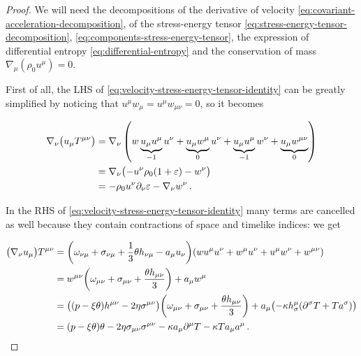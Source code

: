 \documentclass[main.tex]{subfiles}
\begin{document}
\begin{proof}
    We will need the decompositions of
    the derivative of velocity \eqref{eq:covariant-acceleration-decomposition},
    of the stress-energy tensor \eqref{eq:stress-energy-tensor-decomposition}, \eqref{eq:components-stress-energy-tensor},
    the expression of differential entropy \eqref{eq:differential-entropy}
    and the conservation of mass \(\nabla_\mu (\rho_0 u^\mu) = 0\).

    First of all, the LHS of \eqref{eq:velocity-stress-energy-tensor-identity} can be greatly simplified by noticing that \(u^\mu w_\mu = u^\mu w_{\mu \nu} = 0\), so it becomes %

    \vspace{-1cm}

    \begin{subequations}
    \begin{align}
        \nabla_\nu \qty(u_\mu T ^{\mu \nu}) &= \nabla_\nu \left( w \underbrace{u_\mu u^\mu}_{-1} u^\nu + \underbrace{u_\mu w^\mu}_{0} u^\nu + \underbrace{ u_\mu u^\mu}_{-1} w^\nu + \underbrace{u_\mu w ^{\mu \nu}}_{0}\right) \\
         &= \nabla_\nu \qty(- u^\nu \rho_0 (1 + \varepsilon) - w^\nu) \\
         &=  - \rho_0 u^\nu \partial_\nu \varepsilon - \nabla_\nu w^\nu\,.
    \end{align}
    \end{subequations}

    In the RHS of \eqref{eq:velocity-stress-energy-tensor-identity} many terms are cancelled as well because they contain contractions of space and timelike indices: we get

    \begin{subequations}
    \begin{align}
      \qty(\nabla_\nu u_\mu) T^{\mu \nu} &=
      \qty(\omega_{\nu \mu} + \sigma_{\nu\mu} + \frac{1}{3} \theta h_{\nu\mu}
      -  a_\mu u_\nu) \qty(w u^\mu u^\nu + w^\mu u^\nu + u^\mu w^\nu + w ^{\mu \nu})  \\
      &= w^{\mu\nu} \qty(\omega_{\mu\nu} + \sigma_{\mu\nu} + \frac{\theta h_{\mu\nu}}{3}) + a_\mu w^\mu  \\
      &= \qty(\qty(p - \xi \theta) h^{\mu \nu} - 2 \eta \sigma^{\mu \nu})
      \qty(\omega_{\mu\nu} + \sigma_{\mu\nu} + \frac{\theta h_{\mu\nu}}{3})
      + a_\mu \qty(-\kappa h^\mu _\sigma  \qty(\partial^\sigma T + T a^\sigma))  \\
      &= \qty(p - \xi \theta) \theta - 2 \eta \sigma_{\mu\nu} \sigma^{\mu\nu}
      - \kappa a_\mu \partial^\mu T - \kappa T a_\mu a^\mu \,.
    \end{align}
    \end{subequations}


\end{proof}
\end{document}
